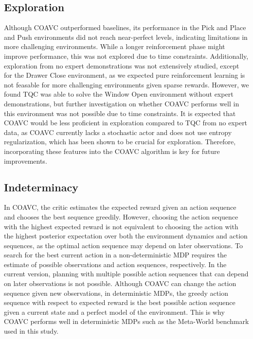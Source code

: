 \subsection{Exploration}
Although COAVC outperformed baselines, its performance in the Pick and Place and Push environments did not reach near-perfect levels, 
indicating limitations in more challenging environments. While a longer reinforcement phase might improve performance, this was not explored 
due to time constraints. Additionally, exploration from no expert demonstrations was not extensively studied, except for the Drawer Close 
environment, as we expected pure reinforcement learning is not feasable for more challenging environments given sparse rewards. 
However, we found TQC was able to solve the Window Open environment without expert demonstrations, but further investigation on whether 
COAVC performs well in this environment was not possible due to time constraints. It is expected that COAVC would be less proficient in exploration 
compared to TQC from no expert data, as COAVC currently lacks a stochastic actor and does not use entropy regularization, which has been shown to 
be crucial for exploration. Therefore, incorporating these features into the COAVC algorithm is key for future improvements.

\subsection{Indeterminacy}
In COAVC, the critic estimates the expected reward given an action sequence and chooses the best sequence greedily. 
However, choosing the action sequence with the highest expected reward is not equivalent to choosing the action with the highest posterior 
expectation over both the environment dynamics and action sequences, as the optimal action sequence may depend on later observations. To 
search for the best current action in a non-deterministic MDP requires the estimate of possible observations and action sequences, respectively. 
In the current version, planning with multiple possible action sequences that can depend on later observations is not possible. 
Although COAVC can change the action sequence given new observations, in deterministic MDPs, the greedy action sequence with respect to expected 
reward is the best possible action sequence given a current state and a perfect model of the environment. This is why COAVC performs well in 
deterministic MDPs such as the Meta-World benchmark used in this study.
